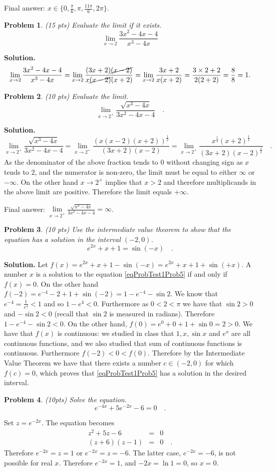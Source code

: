 \documentclass{article}
\newtheorem{problem}{Problem}
\begin{document}
Final answer: $x\in \{0, \frac{\pi}{6},\pi  , \frac{11\pi}{6},2\pi \}$.
\begin{problem} (15 pts) Evaluate the limit if it exists.
\[\lim\limits_{x\to 2} \frac{3x^2-4x-4}{x^3-4x}
\]
\end{problem}
\textbf{Solution.}
\[
\lim\limits_{x\to 2} \frac{3x^2-4x-4}{x^3-4x}=
\lim\limits_{x\to 2}\frac{(3x+2 ) \cancel{(x-2)}} {x\cancel{(x-2)}(x+2)} = \lim\limits_{x\to 2} \frac{3x+2}{x(x+2)}= \frac{3\times 2+2 }{2(2+2)}= \frac{8}{8}=1.
\]
\begin{problem} (10 pts)
Evaluate the limit.
\[\lim\limits_{x\to 2^+} \frac{\sqrt{x^3-4x }}{3x^2 -4x-4 }\quad .
\]
\end{problem}
\textbf{Solution. }
\[
\lim\limits_{x\to 2^+} \frac{\sqrt{x^3-4x }}{3x^2 -4x-4 }=
\lim\limits_{x\to 2^+} \frac{\left( x(x-2)(x+2)\right)^{\frac{1}2}} {(3x+2)(x-2)} = \lim\limits_{x\to 2^+}\frac{ x^{\frac{1}2}(x+2)^{\frac{1}2}}{(3x+2)(x-2)^{\frac{1}2}}\quad .
\]
As the denominator of the above fraction tends to $0$ without changing sign as $x$ tends to $2$, and the numerator is non-zero, the limit must be equal to either $\infty$ or $-\infty$. On the other hand $x\to 2^{+}$ implies that $x>2$ and therefore multiplicands in the above limit are positive. Therefore the limit equals $+\infty$.

Final answer: $\lim\limits_{x\to 2^+} \frac{\sqrt{x^3-4x }}{3x^2 -4x-4 } =\infty$.
\begin{problem} (10 pts)
Use the intermediate value theorem to show that the equation has a solution in the interval $(-2,0)$.
\begin{equation}\label{eqProbTest1Prob5}
e^{2x}+x+1 =\sin  (-x) \quad .
\end{equation}
\end{problem}
\textbf{Solution.} Let $f(x) =  e^{2x}+x+1-\sin(-x)= e^{2x}+x+1+\sin(+x)$. A number $x$  is a solution to the equation \eqref{eqProbTest1Prob5} if and only if $f(x)=0$. On the other hand $f(-2)= e^{-4}-2+1+\sin(-2) = 1-e^{-4}-\sin 2$. We know that $e^{-4}=\frac{1}{e^4}<1$ and so $1-e^4<0$. Furthermore as $0<2<\pi$ we have that $\sin 2 >0 $  and $-\sin 2<0 $ (recall that $\sin 2$ is measured in radians). Therefore $ 1-e^{-4}-\sin 2 <0$. On the other hand, $f(0)= e^0+0+1+\sin 0=2>0$. We have that $f(x)$ is continuous: we studied in class that $1, x, \sin x$ and $ e^x$ are all continuous functions, and we also studied that sum of continuous functions is continuous. Furthermore $f(-2)<0<f(0)$. Therefore by the Intermediate Value Theorem we have that there exists a number $c\in (-2, 0)$ for which $f(c)=0$, which proves that \eqref{eqProbTest1Prob5} has a solution in the desired interval.
\begin{problem} (10pts)
Solve the equation.
\[e^{-4x}+5e^{-2x}-6=0\quad .
\]
\end{problem}
Set $z=e^{-2x}$. The equation becomes
\[
\begin{array}{rcl}
z^2+5z-6&=&0\\
(z+6)(z-1)&=&0\quad .
\end{array}
\]
Therefore $e^{-2x}=z=1$ or $e^{-2x}=z=-6$. The latter case, $e^{-2x}=-6$, is not possible for real $x$. Therefore $e^{-2x}=1$, and $-2x=\ln 1=0$, so $x=0$.
\end{document}
